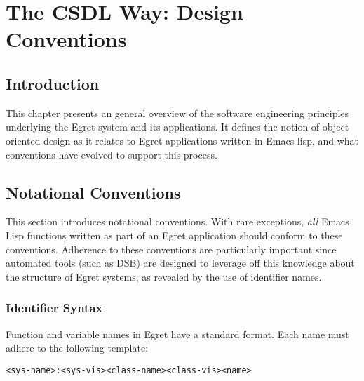 
\chapter{The CSDL Way: Design Conventions}


\section{Introduction}

This chapter presents an general overview of the software engineering
principles underlying the Egret system and its applications. It 
defines the notion of object oriented design as it relates to Egret
applications written in Emacs lisp, and what conventions have evolved 
to support this process.


\section{Notational Conventions}
\label{conventions}

This section introduces notational conventions.  With rare exceptions, {\em all}
Emacs Lisp functions written as part of an Egret application should conform
to these conventions.   Adherence to these conventions are particularly
important since automated tools (such as DSB) are designed to leverage off
this knowledge about the structure of Egret systems, as revealed by the
use of identifier names. 

\subsection{Identifier Syntax}

Function and variable names in Egret have a standard format.
Each name must adhere to the following template:

\small\begin{verbatim}
<sys-name>:<sys-vis><class-name><class-vis><name>
\end{verbatim}\normalsize

